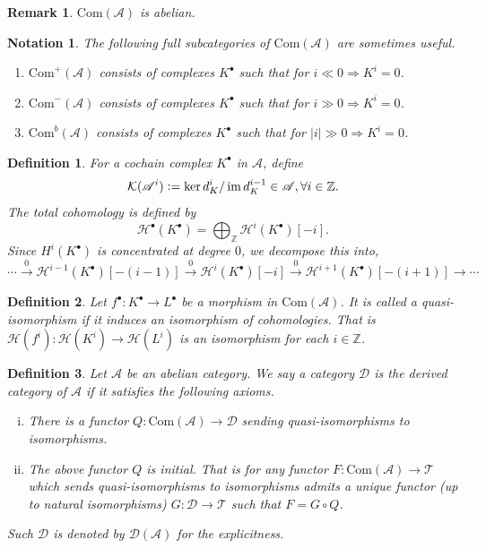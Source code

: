 \documentclass[10pt]{article}
\numberwithin{equation}{section}
\newtheorem{definition}{Definition}[section]
\newtheorem{notation}{Notation}[section]
\newtheorem{remark}{Remark}[section]
\DeclareMathOperator{\image}{im}
\newcommand{\defeq}{\vcentcolon=}
\newcommand{\Z}[0]{\mathbb{Z}}
\newcommand{\cK}[0]{\mathcal{K}}
\newcommand{\cH}[0]{\mathcal{H}}
\newcommand{\cD}[0]{\mathcal{D}}
\newcommand{\ab}[1]{\vert #1 \vert}
\newcommand{\sA}[0]{\mathscr{A}}
\newcommand{\Com}[0]{\mathrm{Com}}
\begin{document}
\begin{remark}
    $\Com(\sA)$ is abelian.
\end{remark}

\begin{notation}
    The following full subcategories of $\Com(\sA)$ are sometimes useful.
    \begin{enumerate}[1. ]
        \item $\Com^+(\sA)$ consists of complexes $K^\bullet$ such that for $i\ll 0\Rightarrow K^i=0$.
        \item $\Com^-(\sA)$ consists of complexes $K^\bullet$ such that for $i\gg 0\Rightarrow K^i=0$.
        \item $\Com^b(\sA)$ consists of complexes $K^\bullet$ such that for $\ab{i}\gg 0\Rightarrow K^i=0$.
    \end{enumerate}
\end{notation}

\begin{definition}
    For a cochain complex $K^\bullet$ in $\sA$, define 
    \begin{equation*}
        \cK(\sA^i) \defeq \ker d_K^i/\image d_K^{i-1}\in \sA,\forall i\in\Z.
    \end{equation*}
    The total cohomology is defined by 
    \begin{equation*}
        \cH^\bullet(K^\bullet) = \bigoplus_{\Z}\cH^i(K^\bullet)[-i].
    \end{equation*}
    Since $H^i(K^\bullet)$ is concentrated at degree $0$, we decompose this into,
    \begin{equation*}
        \cdots\stackrel{0}{\to} \cH^{i-1}(K^\bullet)[-(i-1)]\stackrel{0}{\to} \cH^{i}(K^\bullet)[-i]\stackrel{0}{\to} \cH^{i+1}(K^\bullet)[-(i+1)]\to\cdots
    \end{equation*}
\end{definition}

\begin{definition}
    Let $f^\bullet:K^\bullet\to L^\bullet$ be a morphism in $\Com(\sA)$. It is called a quasi-isomorphism if it induces an isomorphism of cohomologies. That is $\cH(f^i):\cH(K^i)\to\cH(L^i)$ is an isomorphism for each $i\in\Z$.
\end{definition}

\begin{definition}
    Let $\sA$ be an abelian category. We say a category $\cD$ is the derived category of $\sA$ if it satisfies the following axioms.
    \begin{enumerate}[i. ]
        \item There is a functor $Q:\Com(\sA)\to \cD$ sending quasi-isomorphisms to isomorphisms.
        \item The above functor $Q$ is initial. That is for any functor $F:\Com(\sA)\to \mathscr{T}$ which sends quasi-isomorphisms to isomorphisms admits a unique functor (up to natural isomorphisms) $G:\cD\to\mathscr{T}$ such that $F = G\circ Q$.
    \end{enumerate}
    Such $\cD$ is denoted by $\cD(\sA)$ for the explicitness.
\end{definition}
\end{document}
